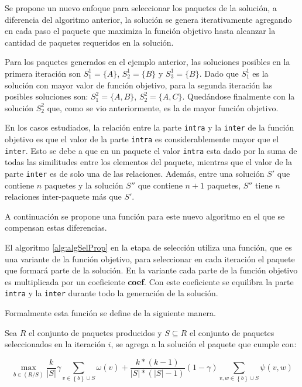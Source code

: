 Se propone un nuevo enfoque para seleccionar los paquetes de la solución, a diferencia del algoritmo anterior, la solución se genera iterativamente agregando en cada paso el paquete que maximiza la función objetivo hasta alcanzar la cantidad de paquetes requeridos en la solución.

Para los paquetes generados en el ejemplo anterior, las soluciones posibles en la primera iteración son $S^{1}_{1}=\{A\}$, $S^{1}_{2}=\{B\}$ y $S^{1}_{3}=\{B\}$. Dado que $S^{1}_{1}$ es la solución con mayor valor de función objetivo, para la segunda iteración las posibles soluciones son:  $S^{2}_{1}=\{A,B\}$, $S^{2}_{2}=\{A,C\}$. Quedándose finalmente con la solución $S^{2}_{2}$ que, como se vio anteriormente, es la de mayor función objetivo.

En los casos estudiados, la relación entre la parte \texttt{intra} y la \texttt{inter} de la función objetivo es que el valor de la parte \texttt{intra} es considerablemente mayor que el \texttt{inter}. Esto se debe a que en un paquete el valor \texttt{intra} esta dado por la suma de todas las similitudes entre los elementos del paquete, mientras que el valor de la parte \texttt{inter} es de solo una de las relaciones. Además, entre una solución $S'$ que contiene $n$ paquetes y la solución $S''$ que contiene $n+1$ paquetes, $S''$ tiene $n$ relaciones inter-paquete más que $S'$. 

A continuación se propone una función para este nuevo algoritmo en el que se compensan estas diferencias.

El algoritmo \ref{alg:algSelProp} en la etapa de selección utiliza una función, que es una variante de la función objetivo, para seleccionar en cada iteración el paquete que formará parte de la solución. En la variante cada parte de la función objetivo es multiplicada por un coeficiente \textbf{coef}. Con este coeficiente se equilibra la parte \texttt{intra} y la \texttt{inter} durante todo la generación de la solución.   

Formalmente esta función se define de la siguiente manera.

Sea $R$ el conjunto de paquetes producidos y $S \subseteq R$ el conjunto de paquetes seleccionados en la iteración $i$, se agrega a la solución el paquete que cumple con:

\begin{equation}
\max_{b \in (R/S)}{\dfrac{k}{|S|}} \gamma \sum_{v \in \left\{b\right\} \cup S}{\omega(v)} + \dfrac{k * (k-1)}{|S| * (|S|-1)} (1-\gamma) \sum_{v,w \in \left\{b\right\} \cup S}{\psi(v,w)}
\end{equation}

